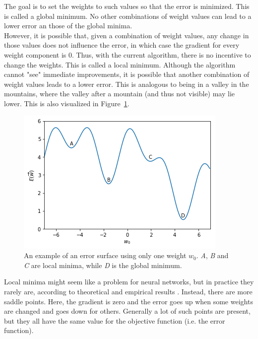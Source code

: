 The goal is to set the weights to such values so that the error is minimized. This is called a global minimum. No other combinations of weight values can lead to a lower error an those of the global minima.\\
However, it is possible that, given a combination of weight values, any change in those values does not influence the error, in which case the gradient for every weight component is $0$. Thus, with the current algorithm, there is no incentive to change the weights. This is called a local minimum. Although the algorithm cannot "see" immediate improvements, it is possible that another combination of weight values leads to a lower error. This is analogous to being in a valley in the mountains, where the valley after a mountain (and thus not visible) may lie lower. This is also visualized in Figure~\ref{fig:error_surface}.\\
\begin{figure}[htb]
    \centering
    \includegraphics[width=\linewidth]{images/error_surface.png}
    \caption[An example of an error surface]{An example of an error surface using only one weight $w_0$. \textit{A}, \textit{B} and \textit{C} are local minima, while \textit{D} is the global minimum.}
    \label{fig:error_surface}
\end{figure}
Local minima might seem like a problem for neural networks, but in practice they rarely are, according to theoretical and empirical results \citep{choromanska2015loss}.
Instead, there are more saddle points. Here, the gradient is zero and the error goes up when some weights are changed and goes down for others. Generally a lot of such points are present, but they all have the same value for the objective function (i.e. the error function).\\

